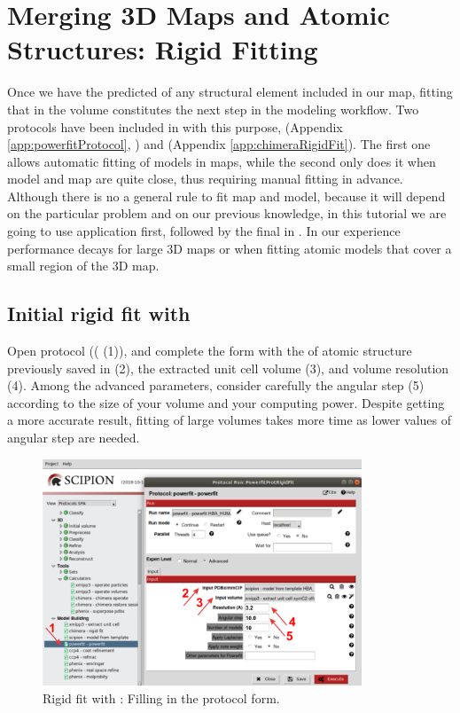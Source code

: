 \section{Merging 3D Maps and Atomic Structures: Rigid Fitting}
Once we have the predicted  of any structural element included in our map, fitting that  in the volume constitutes the next step in the modeling workflow. Two protocols have been included in \scipion with this purpose, \powerfit (Appendix \ref{app:powerfitProtocol}, \citep{vanzundert2016}) and  (Appendix \ref{app:chimeraRigidFit}). The first one allows automatic fitting of models in maps, while the second only does it when model and map are quite close, thus requiring manual fitting in advance. Although there is no a general rule to fit map and model, because it will depend on the particular problem and on our previous knowledge, in this tutorial we are going to use \powerfit application first, followed by the final  in \chimera {}. In our experience \powerfit performance decays for large 3D maps or when fitting atomic models that cover a small region of the 3D map.

\subsection*{Initial rigid fit with \powerfit}
 Open  protocol (( (1)), and complete the form with the  of atomic structure previously saved in \chimera (2), the extracted unit cell volume (3), and volume resolution (4). Among the advanced parameters, consider carefully the angular step (5) according to the size of your volume and your computing power. Despite getting a more accurate result, fitting of large volumes takes more time as  lower values of angular step are needed.  
 
 \begin{figure}[H]
  \centering 
  \captionsetup{width=.7\linewidth} 
  \includegraphics[width=0.85\textwidth]{Images/Fig18}
  \caption{Rigid fit with \powerfit: Filling in the protocol form.}
  \label{fig:powerfit_protocol}
  \end{figure}
 
